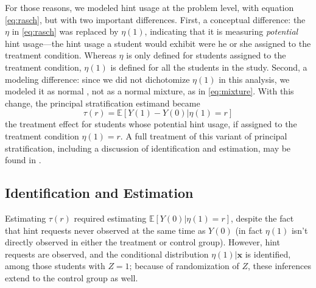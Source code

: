 \documentclass{article}\usepackage[]{graphicx}\usepackage[]{color}
\newcommand{\EE}{\mathbb{E}}
\begin{document}
For those reasons, we modeled hint usage at the problem level, with
equation \eqref{eq:rasch}, but with two important differences.
First, a conceptual difference: the $\eta$ in \eqref{eq:rasch} was
replaced by $\eta (1)$, indicating that it is measuring
\emph{potential} hint usage---the hint usage a student would exhibit
were he or she assigned to the treatment condition.
Whereas $\eta$ is only defined for students assigned to the treatment condition,
$\eta(1)$ is defined for all the students in the study.
Second, a modeling difference: since we did not dichotomize $\eta(1)$
in this analysis, we modeled it as normal , not as a normal mixture, as in
\eqref{eq:mixture}.
With this change, the principal stratification estimand became
\begin{equation*}
\tau(r)=\EE[Y(1)-Y(0)|\eta(1)=r]
\end{equation*}
the treatment effect for students whose potential hint usage, if assigned to the treatment condition $\eta(1)=r$.
A full treatment of this variant of principal stratification, including a
discussion of identification and estimation, may be found in
\citet{aoas}.



\subsection{Identification and Estimation}
Estimating $\tau(r)$ required estimating $\EE[Y(0)|\eta(1)=r]$,
despite the fact that hint requests never observed at the same time as
$Y(0)$ (in fact $\eta(1)$ isn't directly observed in either the
treatment or control group).
However, hint requests are observed, and the conditional distribution
$\eta(1)|\bm{x}$ is identified, among those students with $Z=1$;
because of randomization of $Z$, these inferences extend to the
control group as well.
\end{document}
